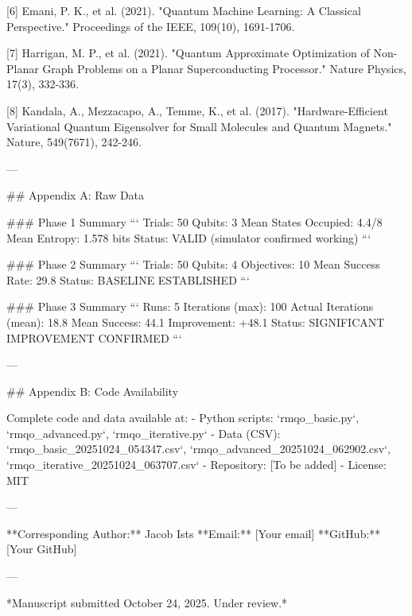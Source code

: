[6] Emani, P. K., et al. (2021). "Quantum Machine Learning: A Classical Perspective." Proceedings of the IEEE, 109(10), 1691-1706.

[7] Harrigan, M. P., et al. (2021). "Quantum Approximate Optimization of Non-Planar Graph Problems on a Planar Superconducting Processor." Nature Physics, 17(3), 332-336.

[8] Kandala, A., Mezzacapo, A., Temme, K., et al. (2017). "Hardware-Efficient Variational Quantum Eigensolver for Small Molecules and Quantum Magnets." Nature, 549(7671), 242-246.

---

## Appendix A: Raw Data

### Phase 1 Summary
```
Trials: 50
Qubits: 3
Mean States Occupied: 4.4/8
Mean Entropy: 1.578 bits
Status: VALID (simulator confirmed working)
```

### Phase 2 Summary
```
Trials: 50
Qubits: 4
Objectives: 10
Mean Success Rate: 29.8%
Status: BASELINE ESTABLISHED
```

### Phase 3 Summary
```
Runs: 5
Iterations (max): 100
Actual Iterations (mean): 18.8
Mean Success: 44.1%
Improvement: +48.1%
Status: SIGNIFICANT IMPROVEMENT CONFIRMED
```

---

## Appendix B: Code Availability

Complete code and data available at:
- Python scripts: `rmqo_basic.py`, `rmqo_advanced.py`, `rmqo_iterative.py`
- Data (CSV): `rmqo_basic_20251024_054347.csv`, `rmqo_advanced_20251024_062902.csv`, `rmqo_iterative_20251024_063707.csv`
- Repository: [To be added]
- License: MIT

---

**Corresponding Author:** Jacob Ists  
**Email:** [Your email]  
**GitHub:** [Your GitHub]  

---

*Manuscript submitted October 24, 2025. Under review.*